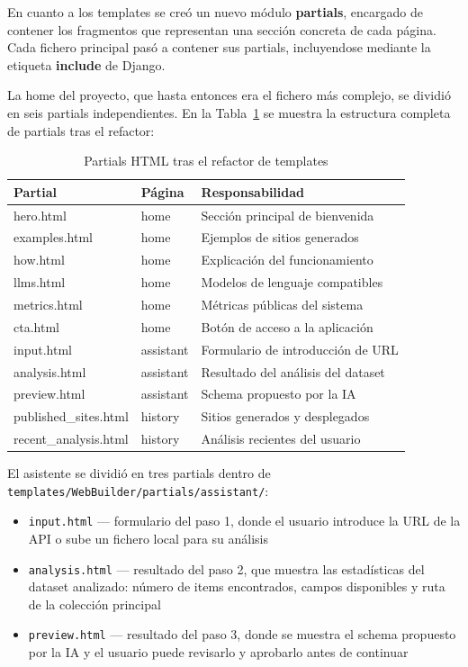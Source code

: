 En cuanto a los templates se creó un nuevo módulo \textbf{partials}, encargado de contener los fragmentos que representan una sección concreta de cada página. Cada fichero principal pasó a contener sus partials, incluyendose mediante la etiqueta \textbf{include} de Django.

La home del proyecto, que hasta entonces era el fichero más complejo, se dividió en seis partials independientes. En la Tabla~\ref{tab:partials-html} se muestra la estructura completa de partials tras el refactor:

\begin{table}[H]
    \centering
    \begin{tabular}{|l|l|p{5cm}|}
        \hline
        \textbf{Partial} & \textbf{Página} & \textbf{Responsabilidad} \\
        \hline
        hero.html & home & Sección principal de bienvenida \\
        \hline
        examples.html & home & Ejemplos de sitios generados \\
        \hline
        how.html & home & Explicación del funcionamiento \\
        \hline
        llms.html & home & Modelos de lenguaje compatibles \\
        \hline
        metrics.html & home & Métricas públicas del sistema \\
        \hline
        cta.html & home & Botón de acceso a la aplicación \\
        \hline
        input.html & assistant & Formulario de introducción de URL \\
        \hline
        analysis.html & assistant & Resultado del análisis del dataset \\
        \hline
        preview.html & assistant & Schema propuesto por la IA \\
        \hline
        published\_sites.html & history & Sitios generados y desplegados \\
        \hline
        recent\_analysis.html & history & Análisis recientes del usuario \\
        \hline
    \end{tabular}
    \caption{Partials HTML tras el refactor de templates}
    \label{tab:partials-html}
\end{table}

El asistente se dividió en tres partials dentro de \texttt{templates/WebBuilder/partials/assistant/}:

\begin{itemize}
    \item \texttt{input.html} — formulario del paso 1, donde el usuario 
    introduce la URL de la API o sube un fichero local para su análisis
    \item \texttt{analysis.html} — resultado del paso 2, que muestra las 
    estadísticas del dataset analizado: número de items encontrados, campos 
    disponibles y ruta de la colección principal
    \item \texttt{preview.html} — resultado del paso 3, donde se muestra 
    el schema propuesto por la IA y el usuario puede revisarlo y aprobarlo 
    antes de continuar
\end{itemize}

